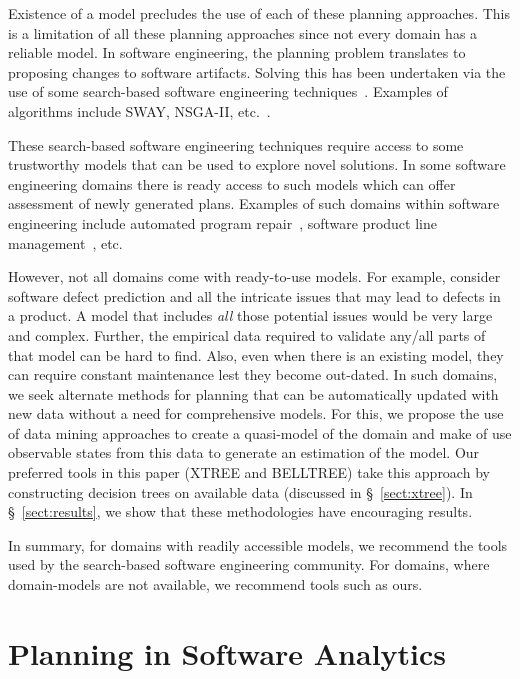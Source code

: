 \documentclass[sigconf, proceedings, 9pt]{acmart}
\newcommand{\tion}[1]{\S~\ref{sect:#1}}
\begin{document}
Existence of a model precludes the use of each of these planning approaches. 
This is a limitation of all these planning approaches since not every domain 
has a reliable model. In software engineering, the planning problem translates 
to proposing changes to software artifacts. Solving this has been undertaken 
via the use of some search-based software engineering 
techniques~\cite{Harman2009}. Examples of algorithms include SWAY, NSGA-II, 
etc.~\cite{nair2016accidental,deb00a}.

These search-based software engineering techniques require access to some 
trustworthy models that can be used to explore novel solutions. In some 
software engineering domains there is ready access to such models which can 
offer assessment of newly generated plans. Examples of such domains within 
software engineering include automated program repair~\cite{Weimer2009, 
LeGoues2015}, software product line management~\cite{sayyad13, henard15}, etc.

However, not all domains come with ready-to-use models. For example, consider 
software defect prediction and all the intricate issues that may lead to 
defects in a product. A model that includes {\em all} those potential issues 
would be very large and complex. Further, the empirical data required to 
validate any/all parts of that model can be hard to find. Also, even when there 
is an existing model, they can require constant  maintenance lest they become 
out-dated. In such domains, we seek alternate methods for planning that can be 
automatically updated with new data without a need for comprehensive models. 
For this, we propose the use of data mining approaches to create a quasi-model 
of the domain 
and make of use observable states from this data to generate an estimation of 
the model. Our preferred tools in this paper (XTREE and BELLTREE) take this 
approach by constructing decision trees on available data (discussed in 
\tion{xtree}). In \tion{results}, we show that these methodologies have 
encouraging results.

In summary, for domains with readily accessible models, we recommend
the tools used by the search-based
software engineering community. For domains, where domain-models are not 
available, we recommend tools such as ours. 


\section{Planning in Software Analytics}
\label{sect:motivate}
\end{document}
